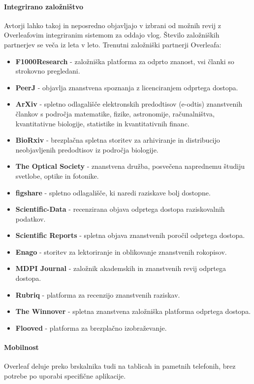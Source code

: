 \documentclass[a4paper, 12pt]{book}
\begin{document}
\paragraph{Integrirano založništvo}
Avtorji lahko takoj in neposredno objavljajo v izbrani od možnih revij z Overleafovim integriranim sistemom za oddajo vlog. Število založniških partnerjev se veča iz leta v leto. Trenutni založniški partnerji Overleafa: \cite{104}
	\begin{itemize}
		\item \textbf{F1000Research} - založniška platforma za odprto znanost, vsi članki so strokovno pregledani. \cite{110}
		\item \textbf{PeerJ} - objavlja znanstvena spoznanja z licenciranjem odprtega dostopa. \cite{111}
		\item \textbf{ArXiv} - spletno odlagališče elektronskih predodtisov (e-odtis) znanstvenih člankov s področja matematike, fizike, astronomije, računalništva, kvantitativne biologije, statistike in kvantitativnih financ. \cite{112}
		\item \textbf{BioRxiv} - brezplačna spletna storitev za arhiviranje in distribucijo neobjavljenih predodtisov iz področja biologije. \cite{113}
		\item \textbf{The Optical Society} - znanstvena družba, posvečena naprednemu študiju svetlobe, optike in fotonike. \cite{114}
		\item \textbf{figshare} - spletno odlagališče, ki naredi raziskave bolj dostopne. \cite{115}
		\item \textbf{Scientific-Data} - recenzirana objava odprtega dostopa raziskovalnih podatkov. \cite{116}
		\item \textbf{Scientific Reports} - spletna objava znanstvenih poročil odprtega dostopa. \cite{117}
		\item \textbf{Enago} - storitev za lektoriranje in oblikovanje znanstvenih rokopisov. \cite{118}
		\item \textbf{MDPI Journal} - založnik akademskih in znanstvenih revij odprtega dostopa. \cite{119}
		\item \textbf{Rubriq} - platforma za recenzijo znanstvenih raziskav. \cite{120}
		\item \textbf{The Winnover} - spletna znanstvena založniška platforma odprtega dostopa. \cite{121}
		\item \textbf{Flooved} - platforma za brezplačno izobraževanje. \cite{122}
	\end{itemize}


\paragraph{Mobilnost}
Overleaf deluje preko brskalnika tudi na tablicah in pametnih telefonih, brez potrebe po uporabi specifične aplikacije.
\end{document}
